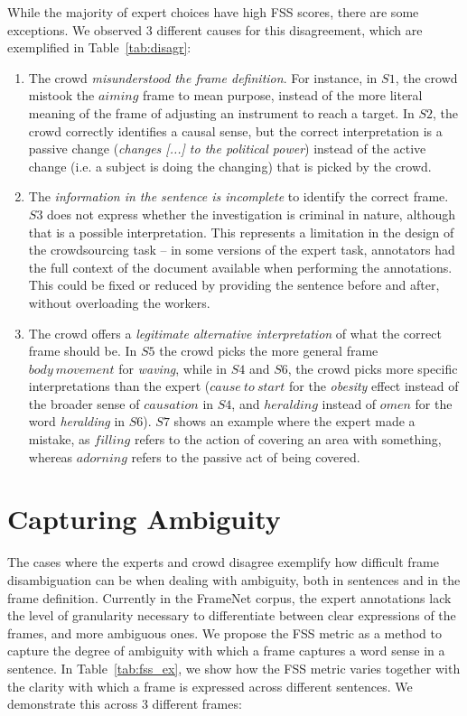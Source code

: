 While the majority of expert choices have high FSS scores, there are some exceptions. We observed 3 different causes for this disagreement, which are exemplified in Table~\ref{tab:disagr}:

\begin{enumerate}

\item The crowd \textit{misunderstood the frame definition}. For instance, in $S1$, the crowd mistook the $aiming$ frame to mean purpose, instead of the more literal meaning of the frame of adjusting an instrument to reach a target. In $S2$, the crowd correctly identifies a causal sense, but the correct interpretation is a passive change (\textit{changes [...] to the political power}) instead of the active change (i.e. a subject is doing the changing) that is picked by the crowd.

\item The \textit{information in the sentence is incomplete} to identify the correct frame. $S3$ does not express whether the investigation is criminal in nature, although that is a possible interpretation. This represents a limitation in the design of the crowdsourcing task -- in some versions of the expert task, annotators had the full context of the document available when performing the annotations. This could be fixed or reduced by providing the sentence before and after, without overloading the workers.

\item The crowd offers a \textit{legitimate alternative interpretation} of what the correct frame should be. In $S5$ the crowd picks the more general frame $body\ movement$ for \textit{waving}, while in $S4$ and $S6$, the crowd picks more specific interpretations than the expert ($cause\ to\ start$ for the \textit{obesity} effect instead of the broader sense of $causation$ in $S4$, and $heralding$ instead of $omen$ for the word \textit{heralding} in $S6$). $S7$ shows an example where the expert made a mistake, as $filling$ refers to the action of covering an area with something, whereas $adorning$ refers to the passive act of being covered.

\end{enumerate}


\section{Capturing Ambiguity}
\label{sec:frame-ambig}

The cases where the experts and crowd disagree exemplify how difficult frame disambiguation can be when dealing with ambiguity, both in sentences and in the frame definition. Currently in the FrameNet corpus, the expert annotations lack the level of granularity necessary to differentiate between clear expressions of the frames, and more ambiguous ones. We propose the FSS metric as a method to capture the degree of ambiguity with which a frame captures a word sense in a sentence. In Table~\ref{tab:fss_ex}, we show how the FSS metric varies together with the clarity with which a frame is expressed across different sentences. We demonstrate this across 3 different frames:

